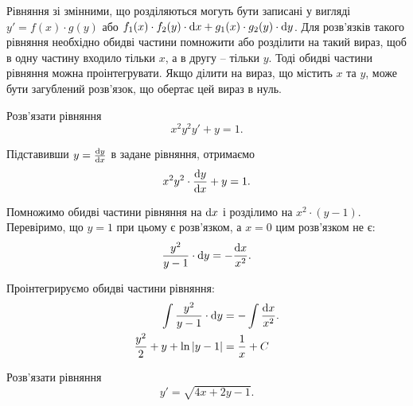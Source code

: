 Рівняння зі змінними, що розділяються могуть бути записані у вигляді $y' = f(x) \cdot g(y)$ або  $f_1(x) \cdot f_2(y) \cdot \mathop{}\!\mathrm{d} x + g_1(x) \cdot g_2(y) \cdot \mathop{}\!\mathrm{d} y$. Для розв’язків такого рівняння необхідно обидві частини помножити або розділити на такий вираз, щоб в одну частину входило тільки $x$, а в другу -- тільки $y$. Тоді обидві частини рівняння можна проінтегрувати.
Якщо ділити на вираз, що містить $x$ та $y$, може бути загублений розв’язок, що обертає цей вираз в нуль.

\begin{example}
	Розв’язати рівняння
	\begin{equation}
		\label{eq:1.13}
		x^2 y^2 y' + y = 1.
	\end{equation}
\end{example}

\begin{solution}
	Підставивши $y = \frac{\mathop{}\!\mathrm{d} y}{\mathop{}\!\mathrm{d} x}$ в задане рівняння, отримаємо 
	\begin{equation}
		\label{eq:1.14}
		x^2 y^2 \cdot \frac{\mathop{}\!\mathrm{d} y}{\mathop{}\!\mathrm{d} x} + y = 1.
	\end{equation}

	Помножимо обидві частини рівняння на $\mathop{}\!\mathrm{d} x$ і розділимо на $x^2 \cdot (y - 1)$. Перевіримо, що $y = 1$ при цьому є розв’язком, а $x = 0$ цим розв’язком не є:
	\begin{equation}
		\label{eq:1.15}
		\frac{y^2}{y - 1} \cdot \mathop{}\!\mathrm{d} y = - \frac{\mathop{}\!\mathrm{d} x}{x^2}.
	\end{equation}

	Проінтегрируємо обидві частини рівняння:
	\begin{align}
		\label{eq:1.16}
		\int \frac{y^2}{y - 1} \cdot \mathop{}\!\mathrm{d} y &= - \int \frac{\mathop{}\!\mathrm{d} x}{x^2}. \\
		\frac{y^2}{2} + y + \ln |y - 1| &= \frac{1}{x} + C
	\end{align}
\end{solution}

\begin{example}
	Розв’язати рівняння
	\begin{equation}
		\label{eq:1.17}
		y' = \sqrt{4x + 2y - 1}.
	\end{equation}
\end{example}

